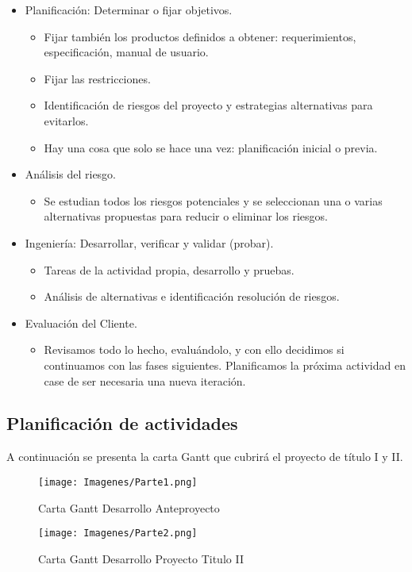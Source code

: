 \documentclass[14pt]{article}
\begin{document}
\begin{itemize}
	\item [\fbox{1.}] Planificación: Determinar o fijar objetivos.
		\begin{itemize}
			\item Fijar también los productos definidos a obtener: requerimientos, especificación, manual de usuario.
			\item Fijar las restricciones.
			\item Identificación de riesgos del proyecto y estrategias alternativas para evitarlos.
			\item Hay una cosa que solo se hace una vez: planificación inicial o previa.	
		\end{itemize}
	\item [\fbox{2.}]	Análisis del riesgo.
		\begin{itemize}
			\item Se estudian todos los riesgos potenciales y se seleccionan una o varias alternativas propuestas para reducir o eliminar los riesgos.
		\end{itemize}
	\item [\fbox {3.}] Ingeniería: Desarrollar, verificar y validar (probar).
		\begin{itemize}
			\item Tareas de la actividad propia, desarrollo y pruebas.
			\item Análisis de alternativas e identificación resolución de riesgos.
		\end{itemize}
	\item [\fbox{4.}] Evaluación del Cliente.
		\begin{itemize}
			\item  Revisamos todo lo hecho, evaluándolo, y con ello decidimos si continuamos con las fases siguientes. Planificamos la próxima actividad en case de ser necesaria una nueva iteración.
		\end{itemize}
\end{itemize}



	\subsection{Planificación de actividades}
A continuación se presenta la carta Gantt que cubrirá el proyecto de título I y II.

	\begin{figure}[h]
					\begin{center}
						\texttt{[image: Imagenes/Parte1.png]}
						\caption{Carta Gantt Desarrollo Anteproyecto}\label{figura:Anteproyecto}	
					\end{center}
	\end{figure}
	\begin{figure}[h]
					\begin{center}
						\texttt{[image: Imagenes/Parte2.png]}
						\caption{Carta Gantt Desarrollo Proyecto Titulo II}\label{figura:Anteproyecto}	
					\end{center}
	\end{figure}
		
\end{document}
